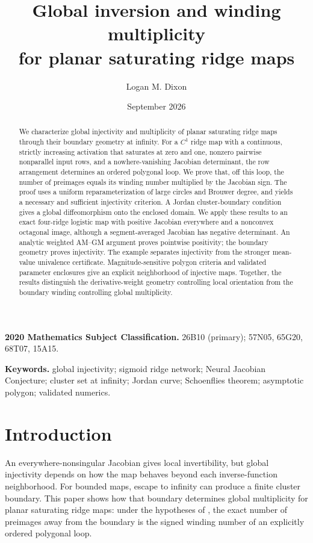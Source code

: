 \documentclass[11pt,twoside,leqno]{article}
\title{Global inversion and winding multiplicity\\for planar saturating ridge maps}
\author{Logan M. Dixon}
\date{September 2026}
\theoremstyle{plain}
\theoremstyle{definition}
\theoremstyle{remark}
\begin{document}
\maketitle

\begin{abstract}
We characterize global injectivity and multiplicity of planar saturating ridge maps through their boundary geometry at infinity. For a $C^1$ ridge map with a continuous, strictly increasing activation that saturates at zero and one, nonzero pairwise nonparallel input rows, and a nowhere-vanishing Jacobian determinant, the row arrangement determines an ordered polygonal loop. We prove that, off this loop, the number of preimages equals its winding number multiplied by the Jacobian sign. The proof uses a uniform reparameterization of large circles and Brouwer degree, and yields a necessary and sufficient injectivity criterion. A Jordan cluster-boundary condition gives a global diffeomorphism onto the enclosed domain. We apply these results to an exact four-ridge logistic map with positive Jacobian everywhere and a nonconvex octagonal image, although a segment-averaged Jacobian has negative determinant. An analytic weighted AM--GM argument proves pointwise positivity; the boundary geometry proves injectivity. The example separates injectivity from the stronger mean-value univalence certificate. Magnitude-sensitive polygon criteria and validated parameter enclosures give an explicit neighborhood of injective maps. Together, the results distinguish the derivative-weight geometry controlling local orientation from the boundary winding controlling global multiplicity.
\end{abstract}

\medskip
\noindent\textbf{2020 Mathematics Subject Classification.} 26B10 (primary); 57N05, 65G20, 68T07, 15A15.

\smallskip
\noindent\textbf{Keywords.} global injectivity; sigmoid ridge network; Neural Jacobian Conjecture; cluster set at infinity; Jordan curve; Schoenflies theorem; asymptotic polygon; validated numerics.

\section{Introduction}\label{sec:intro}
An everywhere-nonsingular Jacobian gives local invertibility, but global injectivity depends on how the map behaves beyond each inverse-function neighborhood. For bounded maps, escape to infinity can produce a finite cluster boundary. This paper shows how that boundary determines global multiplicity for planar saturating ridge maps: under the hypotheses of , the exact number of preimages away from the boundary is the signed winding number of an explicitly ordered polygonal loop.
\end{document}
